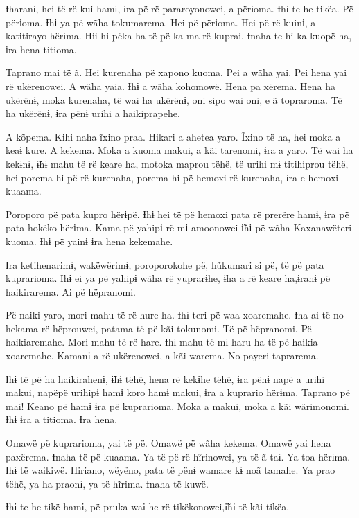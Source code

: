  

 

Ɨharanɨ, hei të rë kui hamɨ, ɨra pë rë pararoyonowei, a përɨoma. Ɨhɨ te
he tikëa. Pë përɨoma. Ɨhɨ ya pë wãha tokumarema. Hei pë përɨoma. Hei pë
rë kuinɨ, a katitirayo hërɨma. Hii hi pëka ha të pë ka ma rë kuprai.
Ɨnaha te hi ka kuopë ha, ɨra hena titioma. 

Taprano mai të ã. Hei kurenaha pë xapono kuoma. Pei a wãha yai. Pei hena
yai rë ukërenowei. A wãha yaia. Ɨhɨ a wãha kohomowë. Hena pa xërema.
Hena ha ukërënɨ, moka kurenaha, të wai ha ukërënɨ, oni sipo wai oni, e ã
topraroma. Të ha ukërënɨ, ɨra pënɨ urihi a haikiprapehe. 

A kõpema. Kihi naha ĩxino praa. Hikari a ahetea yaro. Ĩxino të ha, hei
moka a keaɨ kure. A kekema. Moka a kuoma makui, a kãi tarenomi, ɨra a
yaro. Të wai ha kekɨnɨ, ɨ̃hɨ mahu të rë keare ha, motoka maprou tëhë, të
urihi mɨ titihiprou tëhë, hei porema hi pë rë kurenaha, porema hi pë
hemoxi rë kurenaha, ɨra e hemoxi kuaama. 

Poroporo pë pata kupro hërɨpë. Ɨhɨ hei të pë hemoxi pata rë prerëre
hamɨ, ɨra pë pata hokëko hërɨma. Kama pë yahipɨ rë mɨ amoonowei ɨ̃hɨ pë
wãha Kaxanawëteri kuoma. Ɨhɨ pë yainɨ ɨra hena kekemahe. 

Ɨra ketihenarimɨ, wakëwërimɨ, poroporokohe pë, hũkumari si pë, të pë
pata kuprarioma. Ɨhɨ ei ya pë yahipɨ wãha rë yuprarɨhe, ɨ̃ha a rë keare
ha,ɨranɨ pë haikirarema. Ai pë hëpranomi. 

Pë naiki yaro, mori mahu të rë hure ha. Ɨhɨ teri pë waa xoaremahe. Ɨha
ai të no hekama rë hëprouwei, patama të pë kãi tokunomi. Të pë
hëpranomi. Pë haikiaremahe. Mori mahu të rë hare. Ɨhɨ mahu të mɨ haru ha
të pë haikia xoaremahe. Kamanɨ a rë ukërenowei, a kãi warema. No payeri
taprarema. 

Ɨhɨ të pë ha haikirahenɨ, ɨ̃hɨ tëhë, hena rë kekɨhe tëhë, ɨra pënɨ napë a
urihi makui, napëpë urihipɨ hamɨ koro hamɨ makui, ɨra a kuprario hërɨma.
Taprano pë mai! Keano pë hamɨ ɨra pë kuprarioma. Moka a makui, moka a
kãi wãrimonomi. Ɨhɨ ɨra a titioma. Ɨra hena. 

Omawë pë kuprarioma, yai të pë. Omawë pë wãha kekema. Omawë yai hena
paxërema. Ɨnaha të pë kuaama. Ya të pë rë hĩrinowei, ya të ã taɨ. Ya toa
hërɨma. Ɨhɨ të waikiwë. Hiriano, wëyëno, pata të pënɨ wamare kɨ noã
tamahe. Ya prao tëhë, ya ha praonɨ, ya të hĩrima. Ɨnaha të kuwë. 

Ɨhɨ te he tikë hamɨ, pë pruka waɨ he rë tikëkonowei,ɨ̃hɨ të kãi tikëa. 

